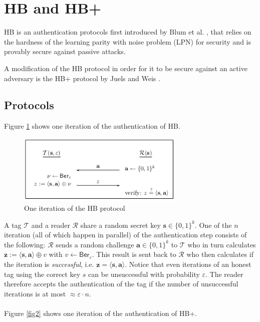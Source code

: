 \documentclass[11pt,a4paper]{article}
\begin{document}
\newcommand{\N}{\mathbb{N}}
\newcommand{\R}{\mathbb{R}}
\newcommand{\Z}{\mathbb{Z}}
\newcommand{\e}{\varepsilon}
\newcommand{\bb}[1]{\boldsymbol{#1}}

\section{HB and HB+}

HB is an authentication protocols first introduced by Blum et al. \cite{10.1007/3-540-45682-1_4}, \cite{10.1007/3-540-48329-2_24} that relies on the hardness of the learning parity with noise problem (LPN) for security and is provably secure against passive attacks. 

A modification of the HB protocol in order for it to be secure against an active adversary is the HB+ protocol by Juels and Weis \cite{juels2005authenticating}.

\subsection{Protocols}

Figure \ref{fig1} shows one iteration of the authentication of HB.

\begin{figure}[h]
	\includegraphics[width=8cm]{hb}
	\centering
	\caption{One iteration of the HB protocol}
	\label{fig1}
\end{figure}

A tag $\mathcal{T}$ and a reader $\mathcal{R}$ share a random secret key $\bb{s} \in \{0,1\}^k$. One of the $n$ iteration (all of which happen in parallel) of the authentication step consists of the following:
$\mathcal{R}$ sends a random challenge $\bb{a} \in \{0,1\}^k$ to $\mathcal{T}$ who in turn calculates $\bb{z}:= \langle \bb{s}, \bb{a} \rangle \oplus v$ with $v \leftarrow \mathsf{Ber}_\e$.
This result is sent back to $\mathcal{R}$ who then calculates if the iteration is \textit{successful}, i.e. $\bb{z} = \langle \bb{s}, \bb{a} \rangle $. 
Notice that even iterations of an honest tag using the correct key $s$ can be unsuccessful with probability $\e$. The reader therefore accepts the authentication of the tag if the number of unsuccessful iterations is at most $\approx \e \cdot n$. \\\\
Figure \ref{fig2} shows one iteration of the authentication of HB+.
\end{document}

